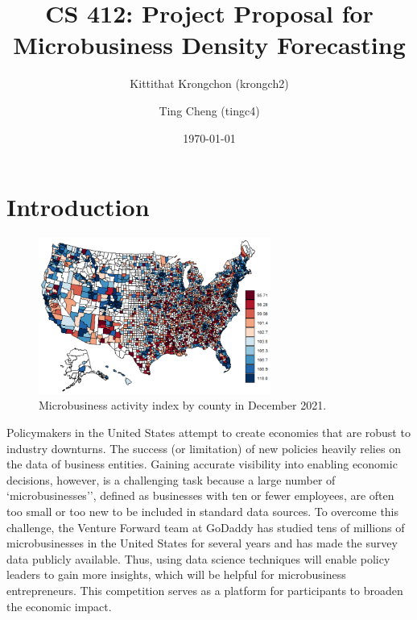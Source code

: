 \documentclass[prl,aps,superscriptaddress,twocolumn,10pt,nolongbibliography]{revtex4-2}
\begin{document}
\title{CS 412: Project Proposal for Microbusiness Density Forecasting}
\author{Kittithat Krongchon (krongch2)}
\author{Ting Cheng (tingc4)}
\date{\today}

\maketitle

\section{Introduction}
\begin{figure}
\includegraphics[width=3in]{figs/activity.png}
\caption{\label{fig:activity}
Microbusiness activity index by county in December 2021.
}
\end{figure}

Policymakers in the United States attempt to create economies that are robust to industry downturns. 
The success (or limitation) of new policies heavily relies on the data of business entities. 
Gaining accurate visibility into enabling economic decisions, however, is a challenging task because a large number of `microbusinesses'', defined as businesses with ten or fewer employees, are often too small or too new to be included in standard data sources.
To overcome this challenge, the Venture Forward team at GoDaddy has studied tens of millions of microbusinesses in the United States for several years and has made the survey data publicly available. 
Thus, using data science techniques will enable policy leaders to gain more insights, which will be helpful for microbusiness entrepreneurs. 
This competition serves as a platform for participants to broaden the economic impact. 
\end{document}
